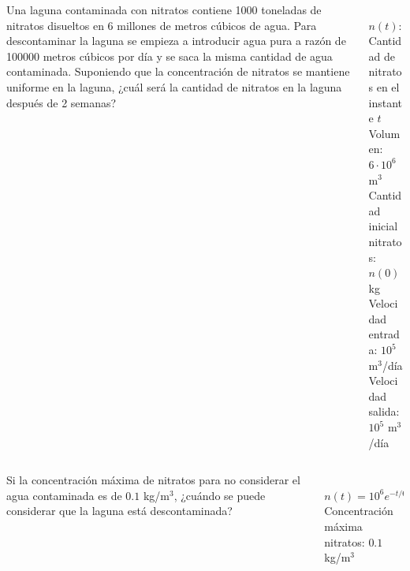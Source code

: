 \documentclass[aspectratio=169,10pt,xcolor=dvipsnames,t]{beamer}
\begin{document}
\begin{frame}
\begin{columns}
\begin{column}[T]{0.7\textwidth}
Una laguna contaminada con nitratos contiene 1000 toneladas de nitratos disueltos en 6 millones de metros cúbicos de agua. 
Para descontaminar la laguna se empieza a introducir agua pura a razón de 100000 metros cúbicos por día y se saca la misma cantidad de agua contaminada. 
Suponiendo que la concentración de nitratos se mantiene uniforme en la laguna, ¿cuál será la cantidad de nitratos en la laguna después de 2 semanas? 
\end{column}
\quad
\begin{column}[T]{0.3\textwidth}
\\
$n(t)$: Cantidad de nitratos en el instante $t$\\
Volumen: $6\cdot 10^6$ m$^3$\\
Cantidad inicial nitratos: $n(0)= 10^6$ kg\\
Velocidad entrada: $10^5$ m$^3$/día\\
Velocidad salida: $10^5$ m$^3$/día
\end{column}
\end{columns}
\end{frame}


\begin{frame}
\begin{columns}
\begin{column}[T]{0.7\textwidth}
Si la concentración máxima de nitratos para no considerar el agua contaminada es de $0.1$ kg/m$^3$, ¿cuándo se puede considerar que la laguna está descontaminada?
\end{column}
\begin{column}[T]{0.3\textwidth}
\\
$n(t)=10^6e^{-t/60}$\\
Concentración máxima nitratos: $0.1$ kg/m$^3$
\end{column}
\end{columns}
\end{frame}
\end{document}
